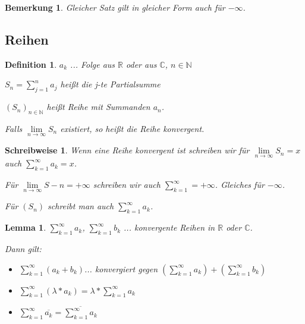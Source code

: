 \documentclass[twocolumn]{article}
\newtheorem{lemma}[theorem]{Lemma}
\newtheorem{definition}{Definition}[section]
\newtheorem*{remark}{Bemerkung}
\newtheorem*{schreibweise}{Schreibweise}
\begin{document}
\begin{remark}
	Gleicher Satz gilt in gleicher Form auch für $-\infty$.
\end{remark}

\subsection{Reihen}

\begin{definition}
	$a_k$ ... Folge aus $\mathbb{R}$ oder aus $\mathbb{C}$, $n\in\mathbb{N}$
	
	$S_n=\sum_{j=1}^{n}a_j$ heißt die j-te Partialsumme
	
	$(S_n)_{n \in \mathbb{N}}$ heißt Reihe mit Summanden $a_n$.
	
	Falls $\lim\limits_{n\rightarrow\infty}S_n$ existiert, so heißt die Reihe konvergent.
\end{definition}

\begin{schreibweise}
	Wenn eine Reihe konvergent ist schreiben wir für $\lim\limits_{n\rightarrow\infty}S_n=x$ auch $\sum_{k=1}^{\infty}a_k=x$.
	
	Für $\lim\limits_{n\rightarrow\infty}S-n=+\infty$ schreiben wir auch $\sum_{k=1}^{\infty}=+\infty$. Gleiches für $-\infty$.
	
	Für $(S_n)$ schreibt man auch $\sum_{k=1}^{\infty}a_k$.
\end{schreibweise}

\begin{lemma}
	$\sum_{k=1}^{\infty}a_k$, $\sum_{k=1}^{\infty}b_k$ ... konvergente Reihen in $\mathbb{R}$ oder $\mathbb{C}$.
	
	Dann gilt:
	\begin{itemize}
		\item $\sum_{k=1}^{\infty}(a_k+b_k)$... konvergiert gegen $(\sum_{k=1}^{\infty}a_k)+(\sum_{k=1}^{\infty}b_k)$
		\item $\sum_{k=1}^{\infty}(\lambda*a_k)=\lambda*\sum_{k=1}^{\infty}a_k$
		\item $\sum_{k=1}^{\infty}\overline{a_k}=\overline{\sum_{k=1}^{\infty}a_k}$
	\end{itemize}
\end{lemma}
\end{document}
